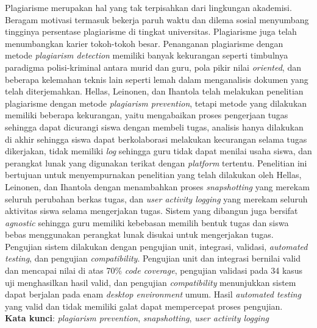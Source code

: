 \documentclass{skripsi}
\begin{document}
{\abstractind

  \noindent
  Plagiarisme merupakan hal yang tak terpisahkan dari lingkungan
  akademisi. Beragam motivasi termasuk bekerja paruh waktu dan dilema
  sosial menyumbang tingginya persentase plagiarisme di tingkat
  universitas. Plagiarisme juga telah menumbangkan karier tokoh-tokoh
  besar. Penanganan plagiarisme dengan metode \emph{plagiarism
    detection} memiliki banyak kekurangan seperti timbulnya paradigma
  polisi-kriminal antara murid dan guru, pola pikir nilai
  \emph{oriented}, dan beberapa kelemahan teknis lain seperti lemah
  dalam menganalisis dokumen yang telah diterjemahkan. Hellas,
  Leinonen, dan Ihantola telah melakukan penelitian plagiarisme dengan
  metode \emph{plagiarism prevention}, tetapi metode yang dilakukan
  memiliki beberapa kekurangan, yaitu mengabaikan proses pengerjaan
  tugas sehingga dapat dicurangi siswa dengan membeli tugas, analisis
  hanya dilakukan di akhir sehingga siswa dapat berkolaborasi
  melakukan kecurangan selama tugas dikerjakan, tidak memiliki
  \emph{log} sehingga guru tidak dapat menilai usaha siswa, dan
  perangkat lunak yang digunakan terikat dengan \emph{platform}
  tertentu. Penelitian ini bertujuan untuk menyempurnakan penelitian
  yang telah dilakukan oleh Hellas, Leinonen, dan Ihantola dengan
  menambahkan proses \emph{snapshotting} yang merekam seluruh
  perubahan berkas tugas, dan \emph{user activity logging} yang merekam
  seluruh aktivitas siswa selama mengerjakan tugas. Sistem yang
  dibangun juga bersifat \emph{agnostic} sehingga guru memiliki
  kebebasan memilih bentuk tugas dan siswa bebas menggunakan perangkat
  lunak disukai untuk mengerjakan tugas. Pengujian sistem dilakukan
  dengan pengujian unit, integrasi, validasi, \emph{automated testing}, dan
  pengujian \emph{compatibility}. Pengujian unit dan integrasi bernilai valid dan
  mencapai nilai di atas 70\% \emph{code coverage}, pengujian
  validasi pada 34 kasus uji menghasilkan hasil valid, dan
  pengujian \emph{compatibility} menunjukkan sistem dapat berjalan
  pada enam \emph{desktop environment} umum. Hasil \emph{automated
    testing} yang valid dan tidak memiliki galat dapat mempercepat
  proses pengujian.\\

  \noindent
  \textbf{Kata kunci}: \emph{plagiarism prevention},
  \emph{snapshotting}, \emph{user activity logging}

}
\end{document}
